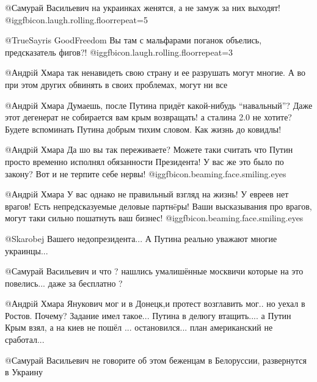 \begin{itemize}
\begin{itemize}

@Самурай Васильевич  на украинках женятся, а не замуж за них выходят!
@igg{fbicon.laugh.rolling.floor}{repeat=5} 


@TrueSayris GoodFreedom  Вы там с мальфарами поганок объелись, предсказатель
фигов?!  @igg{fbicon.laugh.rolling.floor}{repeat=3} 


@Андрiй Хмара  так ненавидеть свою страну и ее разрушать могут  многие. А во
при этом других обвинять в своих проблемах, могут ни все


@Андрiй Хмара  Думаешь, после  Путина придёт какой-нибудь \enquote{навальный}? Даже
этот дегенерат не собирается вам крым возвращать! а сталина 2.0 не хотите?
Будете вспоминать Путина добрым тихим словом. Как жизнь до ковидлы!


@Андрiй Хмара  Да шо вы так переживаете? Можете таки считать что Путин просто
временно исполнял обязанности Президента! У вас же это было по закону? Вот и
не терпите себе нервы!  @igg{fbicon.beaming.face.smiling.eyes} 


@Андрiй Хмара  У вас однако не правильный взгляд на жизнь! У евреев нет
врагов! Есть непредсказуемые деловые партнëры! Ваши высказывания про врагов,
могут таки сильно пошатнуть ваш бизнес!  @igg{fbicon.beaming.face.smiling.eyes} 


@Skarobej  Вашего недопрезидента... А Путина реально уважают многие украинцы...


@Самурай Васильевич  и что ? нашлись умалишённые москвичи которые на это
повелись... даже за бесплатно ?


@Андрiй Хмара  Янукович мог и в Донецк,и протест возглавить мог.. но уехал в
Ростов. Почему? Задание имел такое... Путина в делюгу втащить.... а Путин Крым
взял, а на киев не пошёл ... остановился... план американский не сработал...


@Самурай Васильевич  не говорите об этом беженцам в Белоруссии, развернутся в
Украину



\end{itemize}
\end{itemize}
